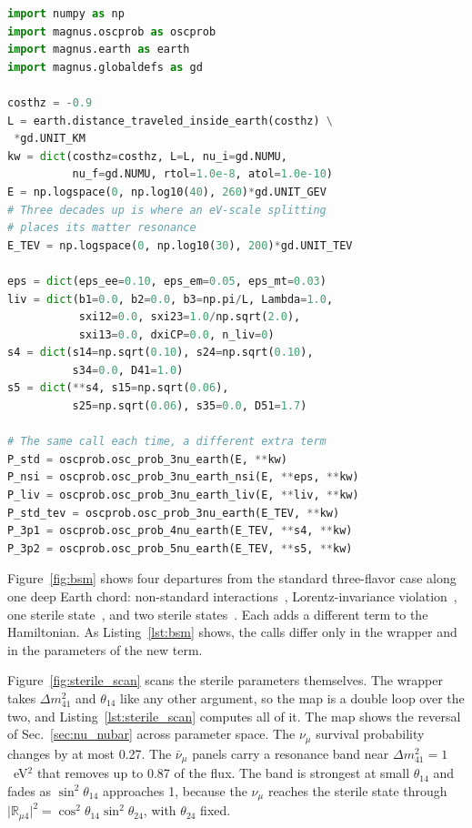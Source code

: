 \documentclass[final,5p,times,twocolumn,sort,compress]{elsarticle}
\makeatletter
\newcommand{\fig}{Fig.}
\DeclareRobustCommand{\_}{%
  \ifmmode\nfss@text{\textunderscore}\else\textunderscore\allowbreak\fi}
\newcommand{\figu}[1]{\fig~\ref{fig:#1}}
\makeatother
\begin{document}
\begin{lstlisting}[language=Python, caption={\textbf{New physics along an Earth chord.} The five scenarios of \figu{bsm}, in six calls: the standard case is computed twice, once for each energy range. Every call shares the chord, the channel and the tolerances, differing only in the wrapper and in the parameters of the extra term. See notebooks \#07, \#08, \#09, and \#28, and Sec.~\ref{sec:bsm} for details.}, label={lst:bsm}, float=b]
import numpy as np
import magnus.oscprob as oscprob
import magnus.earth as earth
import magnus.globaldefs as gd

costhz = -0.9
L = earth.distance_traveled_inside_earth(costhz) \
 *gd.UNIT_KM
kw = dict(costhz=costhz, L=L, nu_i=gd.NUMU,
          nu_f=gd.NUMU, rtol=1.0e-8, atol=1.0e-10)
E = np.logspace(0, np.log10(40), 260)*gd.UNIT_GEV
# Three decades up is where an eV-scale splitting
# places its matter resonance
E_TEV = np.logspace(0, np.log10(30), 200)*gd.UNIT_TEV

eps = dict(eps_ee=0.10, eps_em=0.05, eps_mt=0.03)
liv = dict(b1=0.0, b2=0.0, b3=np.pi/L, Lambda=1.0,
           sxi12=0.0, sxi23=1.0/np.sqrt(2.0),
           sxi13=0.0, dxiCP=0.0, n_liv=0)
s4 = dict(s14=np.sqrt(0.10), s24=np.sqrt(0.10),
          s34=0.0, D41=1.0)
s5 = dict(**s4, s15=np.sqrt(0.06),
          s25=np.sqrt(0.06), s35=0.0, D51=1.7)

# The same call each time, a different extra term
P_std = oscprob.osc_prob_3nu_earth(E, **kw)
P_nsi = oscprob.osc_prob_3nu_earth_nsi(E, **eps, **kw)
P_liv = oscprob.osc_prob_3nu_earth_liv(E, **liv, **kw)
P_std_tev = oscprob.osc_prob_3nu_earth(E_TEV, **kw)
P_3p1 = oscprob.osc_prob_4nu_earth(E_TEV, **s4, **kw)
P_3p2 = oscprob.osc_prob_5nu_earth(E_TEV, **s5, **kw)
\end{lstlisting}

Figure~\ref{fig:bsm} shows four departures from the standard three-flavor case along one deep Earth chord: non-standard interactions\ \cite{Farzan:2017xzy}, Lorentz-invariance violation\ \cite{Kostelecky:2003xn, Kostelecky:2011gq}, one sterile state\ \cite{Gariazzo:2015rra, Dentler:2018sju}, and two sterile states\ \cite{Sorel:2003hf}. Each adds a different term to the Hamiltonian. As Listing~\ref{lst:bsm} shows, the calls differ only in the wrapper and in the parameters of the new term.

Figure~\ref{fig:sterile_scan} scans the sterile parameters themselves. The wrapper takes $\Delta m^2_{41}$ and $\theta_{14}$ like any other argument, so the map is a double loop over the two, and Listing~\ref{lst:sterile_scan} computes all of it. The map shows the reversal of Sec.~\ref{sec:nu_nubar} across parameter space. The $\nu_\mu$ survival probability changes by at most 0.27. The $\bar{\nu}_\mu$ panels carry a resonance band near $\Delta m^2_{41} = 1$~eV$^2$ that removes up to 0.87 of the flux. The band is strongest at small $\theta_{14}$ and fades as $\sin^2\theta_{14}$ approaches 1, because the $\nu_\mu$ reaches the sterile state through $\lvert \mathbb{R}_{\mu 4} \rvert^2 = \cos^2\theta_{14} \sin^2\theta_{24}$, with $\theta_{24}$ fixed.
\end{document}
